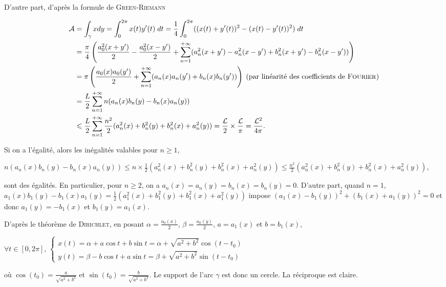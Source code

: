 {{D'autre part, d'après la formule de \textsc{Green}-\textsc{Riemann}

\begin{align*}\ensuremath
\mathcal{A}&=\int_{\gamma}^{}xdy=\int_{0}^{2\pi}x(t)y'(t)\;dt= \frac{1}{4}\int_{0}^{2\pi}((x(t)+y'(t))^2-(x(t)-y'(t))^2)\;dt\\
 &= \frac{\pi}{4}\left( \frac{a_0^2(x+y')}{2}- \frac{a_0^2(x-y')}{2}+\sum_{n=1}^{+\infty}(a_n^2(x+y')-a_n^2(x-y')+b_n^2(x+y')-b_n^2(x-y'))\right)\\
 &=\pi\left( \frac{a_0(x)a_0(y')}{2}+\sum_{n=1}^{+\infty}(a_n(x)a_n(y')+b_n(x)b_n(y'))\right)\;(\text{par linéarité des coefficients de \textsc{Fourier}})\\
 &= \frac{L}{2}\sum_{n=1}^{+\infty}n(a_n(x)b_n(y)-b_n(x)a_n(y))\\
 &\leqslant \frac{L}{2}\sum_{n=1}^{+\infty} \frac{n^2}{2}(a_n^2(x)+b_n^2(y)+b_n^2(x)+a_n^2(y))= \frac{\mathcal{L}}{2}\times \frac{\mathcal{L}}{\pi}= \frac{\mathcal{L}^2}{4\pi}.
\end{align*}

Si on a l'égalité, alors les inégalités valables pour $n\geqslant1$, 

\begin{center}
$n(a_n(x)b_n(y)-b_n(x)a_n(y))\leqslant n\times \frac{1}{2}(a_n^2(x)+b_n^2(y)+b_n^2(x)+a_n^2(y))\leqslant  \frac{n^2}{2}(a_n^2(x)+b_n^2(y)+b_n^2(x)+a_n^2(y))$,
\end{center}

sont des égalités. En particulier, pour $n\geqslant2$, on a $a_n(x)=a_n(y)=b_n(x)=b_n(y)=0$. D'autre part, quand $n=1$, $a_1(x)b_1(y)-b_1(x)a_1(y)= \frac{1}{2}(a_1^2(x)+b_1^2(y)+b_1^2(x)+a_1^2(y))$ impose $(a_1(x)-b_1(y))^2+(b_1(x)+a_1(y))^2=0$ et donc $a_1(y)=-b_1(x)$ et $b_1(y)=a_1(x)$.

D'après le théorème de \textsc{Dirichlet}, en posant $\alpha= \frac{a_0(x)}{2}$, $\beta= \frac{a_0(y)}{2}$, $a=a_1(x)$ et $b=b_1(x)$,

\begin{center}
$\forall t\in[0,2\pi]$, $\left\{
\begin{array}{l}
x(t)=\alpha+a\cos t+b\sin t=\alpha+\sqrt{a^2+b^2}\cos(t-t_0)\\
y(t)=\beta-b\cos t+a\sin t=\beta+\sqrt{a^2+b^2}\sin(t-t_0)
\end{array}
\right.$
\end{center}

où $\cos(t_0)= \frac{a}{\sqrt{a^2+b^2}}$ et $\sin(t_0)= \frac{b}{\sqrt{a^2+b^2}}$. Le support de l'arc $\gamma$ est donc un cercle. La réciproque est claire.

}}
